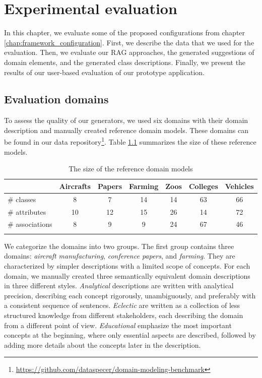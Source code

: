 \chapter{Experimental evaluation}
\label{chap:evaluation}

In this chapter, we evaluate some of the proposed configurations from chapter \ref{chap:framework_configuration}. First, we describe the data that we used for the evaluation. Then, we evaluate our RAG approaches, the generated suggestions of domain elements, and the generated class descriptions. Finally, we present the results of our user-based evaluation of our prototype application.


\section{Evaluation domains}

To assess the quality of our generators, we used six domains with their domain description and manually created reference domain models. These domains can be found in our data repository\footnote{\url{https://github.com/dataspecer/domain-modeling-benchmark}}. Table \ref{tab:reference-model-size} summarizes the size of these reference models.

\begin{table}[!h]
    \scriptsize
    \centering
    \setlength{\tabcolsep}{0.5em}
    \begin{tabular}{lcccccc}
         & Aircrafts & Papers & Farming & Zoos & Colleges & Vehicles \\
    \toprule
    \addlinespace
         \# classes      & 8  & 7  & 14 & 14 & 63 & 66 \\
         \# attributes   & 10 & 12 & 15 & 26 & 14 & 72 \\
         \# associations & 8  & 9  & 9  & 24 & 67 & 46 \\
    \addlinespace
    \bottomrule
    \addlinespace
    \end{tabular}
    \caption{The size of the reference domain models}
    \label{tab:reference-model-size}
\end{table}


We categorize the domains into two groups.
The first group contains three domains: \emph{aircraft manufacturing}, \emph{conference papers}, and \emph{farming}.
They are characterized by simpler descriptions with a limited scope of concepts.
For each domain, we manually created three semantically equivalent domain descriptions in three different styles.
\emph{Analytical} descriptions are written with analytical precision, describing each concept rigorously, unambiguously, and preferably with a consistent sequence of sentences.
\emph{Eclectic} are written as a collection of less structured knowledge from different stakeholders, each describing the domain from a different point of view.
\emph{Educational} emphasize the most important concepts at the beginning, where only essential aspects are described, followed by adding more details about the concepts later in the description.

